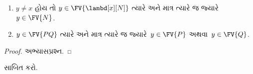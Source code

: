 \documentclass[../../../include/open-logic-section]{subfiles}
\begin{document}
\begin{lem}
  \begin{enumerate}
    \item {} $y \neq x$ હોય તો
      $y \in \FV{\lambd[x][N]}$ ત્યારે અને માત્ર ત્યારે જ
      જ્યારે~$y \in \FV{N}$.
    \item {} $y \in \FV{PQ}$ ત્યારે અને માત્ર
      ત્યારે જ જ્યારે~$y \in \FV{P}$ અથવા~$y
      \in \FV{Q}$.
    \end{enumerate}
\end{lem}

\begin{proof}
  અભ્યાસપ્રશ્ન.
\end{proof}

\begin{prob}
   સાબિત કરો.
\end{prob}
\end{document}
